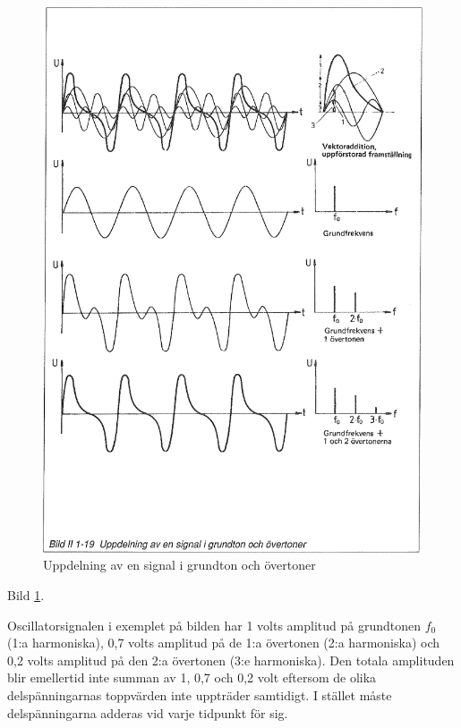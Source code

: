\begin{figure}
\begin{center}
\includegraphics[width=\textwidth]{images/bild_2_1-19}
\caption{Uppdelning av en signal i grundton och övertoner}
\label{fig:BildII1-19}
\end{center}
\end{figure}

Bild \ref{fig:BildII1-19}.

Oscillatorsignalen i exemplet på bilden har 1 volts amplitud på grundtonen
\(f_0\) (1:a harmoniska), 0,7 volts amplitud på de 1:a övertonen
(2:a harmoniska) och 0,2 volts amplitud på den 2:a övertonen (3:e harmoniska).
Den totala amplituden blir emellertid inte summan av 1, 0,7 och 0,2 volt
eftersom de olika delspänningarnas toppvärden inte uppträder samtidigt.
I stället måste delspänningarna adderas vid varje tidpunkt för sig.

